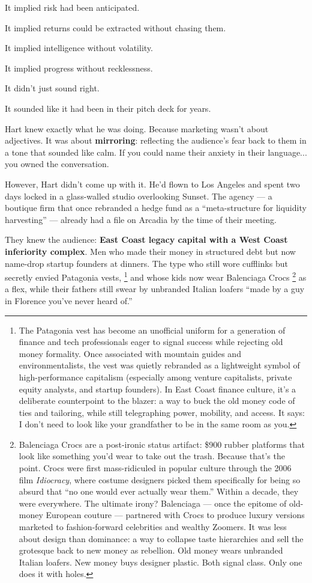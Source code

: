 It implied risk had been anticipated.  

It implied returns could be extracted without chasing them.  

It implied intelligence without volatility. 

It implied progress without recklessness.

It didn’t just sound right. 

It sounded like it had been in their pitch deck for years.

Hart knew exactly what he was doing.  
Because marketing wasn’t about adjectives.  
It was about \textbf{mirroring}: reflecting the audience’s fear back to them in a tone that sounded like calm.  
If you could name their anxiety in their language...  
you owned the conversation.

However, Hart didn’t come up with it.
He’d flown to Los Angeles and spent two days locked in a glass-walled studio overlooking Sunset.
The agency — a boutique firm that once rebranded a hedge fund as a “meta-structure for liquidity harvesting” — already 
had a file on Arcadia by the time of their meeting.

They knew the audience: \textbf{East Coast legacy capital with a West Coast inferiority complex}.
Men who made their money in structured debt but now name-drop startup founders at dinners.
The type who still wore cufflinks but secretly envied Patagonia vests,
\footnote{The Patagonia vest has become an unofficial uniform for a generation of finance and tech professionals eager to 
signal success while rejecting old money formality. Once associated with mountain guides and environmentalists, the vest was 
quietly rebranded as a lightweight symbol of high-performance capitalism (especially among venture capitalists, private equity 
analysts, and startup founders). In East Coast finance culture, it’s a deliberate counterpoint to the blazer: a way to buck the 
old money code of ties and tailoring, while still telegraphing power, mobility, and access. It says: I don’t need to look like 
your grandfather to be in the same room as you.} 
and whose kids now wear Balenciaga Crocs
\footnote{Balenciaga Crocs are a post-ironic status artifact: \$900 rubber platforms that look like something you'd wear to 
take out the trash. Because that’s the point. Crocs were first mass-ridiculed in popular culture through the 2006 film 
\textit{Idiocracy}, where costume designers picked them specifically for being so absurd that “no one would ever actually wear 
them.” Within a decade, they were everywhere. The ultimate irony? Balenciaga — once the epitome of old-money European couture 
— partnered with Crocs to produce luxury versions marketed to fashion-forward celebrities and wealthy Zoomers. It was less
 about design than dominance: a way to collapse taste hierarchies and sell the grotesque back to new money as rebellion. 
 Old money wears unbranded Italian loafers. New money buys designer plastic. Both signal class. Only one does it with holes.}
 as a flex, while their fathers still swear by unbranded Italian loafers 
``made by a guy in Florence you’ve never heard of.''

